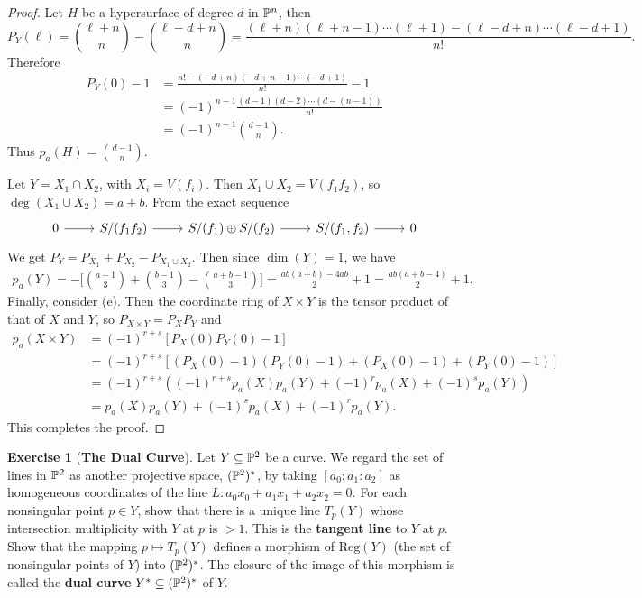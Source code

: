 \documentclass[11pt]{book}
\theoremstyle{definition}
\newtheorem{exercise}{Exercise}[section]
\begin{document}
\begin{proof}
Let $H$ be a hypersurface of degree $d$ in $\P^n$, then
\[P_Y(\ell)=\binom{\ell+n}{n}-\binom{\ell-d+n}{n}=\frac{(\ell+n)(\ell+n-1)\cdots(\ell+1)-(\ell-d+n)\cdots(\ell-d+1)}{n!}.\]
Therefore
\begin{align*}
P_Y(0)-1&=\frac{n!-(-d+n)(-d+n-1)\cdots(-d+1)}{n!}-1\\
&=(-1)^{n-1}\frac{(d-1)(d-2)\cdots(d-(n-1))}{n!}\\
&=(-1)^{n-1}\binom{d-1}{n}.
\end{align*}
Thus $p_a(H)=\binom{d-1}{n}$.\par
Let $Y=X_1\cap X_2$, with $X_i=V(f_i)$. Then $X_1\cup X_2=V(f_1f_2)$, so $\deg(X_1\cup X_2)=a+b$. From the exact sequence
\[\begin{tikzcd}
0\ar[r]&S/(f_1f_2)\ar[r]&S/(f_1)\oplus S/(f_2)\ar[r]& S/(f_1,f_2)\ar[r]&0
\end{tikzcd}\]
We get $P_{Y}=P_{X_1}+P_{X_2}-P_{X_1\cup X_2}$. Then since $\dim(Y)=1$, we have
\begin{align*}
p_a(Y)=-\Big[\binom{a-1}{3}+\binom{b-1}{3}-\binom{a+b-1}{3}\Big]=\frac{ab(a+b)-4ab}{2}+1=\frac{ab(a+b-4)}{2}+1.
\end{align*}
Finally, consider (e). Then the coordinate ring of $X\times Y$ is the tensor product of that of $X$ and $Y$, so $P_{X\times Y}=P_XP_Y$ and
\begin{align*}
p_a(X\times Y)&=(-1)^{r+s}[P_X(0)P_Y(0)-1]\\
&=(-1)^{r+s}[(P_X(0)-1)(P_Y(0)-1)+(P_X(0)-1)+(P_Y(0)-1)]\\
&=(-1)^{r+s}((-1)^{r+s}p_a(X)p_a(Y)+(-1)^{r}p_a(X)+(-1)^sp_a(Y))\\
&=p_a(X)p_a(Y)+(-1)^sp_a(X)+(-1)^rp_a(Y).
\end{align*}
This completes the proof. 
\end{proof}
\begin{exercise}[\textbf{The Dual Curve}]
Let $Y\sub\P^2$ be a curve. We regard the set of lines in $\P^2$ as another projective space, $(\P^2)^*$, by taking $[a_0:a_1:a_2]$ as homogeneous coordinates of the line $L:a_0x_0+a_1x_1+a_2x_2=0$. For each nonsingular point $p\in Y$, show that there is a unique line $T_p(Y)$ whose intersection multiplicity with $Y$ at $p$ is $>1$. This is the \textbf{tangent line} to $Y$ at $p$. Show that the mapping $p\mapsto T_p(Y)$ defines a morphism of $\mathrm{Reg}(Y)$ (the set of nonsingular points of $Y$) into $(\P^2)^*$. The closure of the image of this morphism is called the \textbf{dual curve} $Y^*\sub(\P^2)^*$ of $Y$.
\end{exercise}
\end{document}
